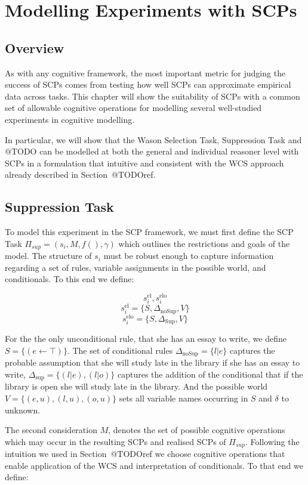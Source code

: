 \chapter{Modelling Experiments with SCPs} \label{chp:model}
\section{Overview}
As with any cognitive framework, the most important metric for judging the success of SCPs comes from testing how well SCPs can approximate empirical data across tasks. This chapter will show the suitability of SCPs with a common set of allowable cognitive operations for modelling several well-studied experiments in cognitive modelling.

In particular, we will show that the Wason Selection Task, Suppression Task and @TODO can be modelled at both the general and individual reasoner level with SCPs in a formulation that intuitive and consistent with the WCS approach already described in Section~@TODOref.
\section{Suppression Task} \label{sec:supSCP}



To model this experiment in the SCP framework, we must first define the SCP Task $\Pi_{sup}=(s_i,M,f(),\gamma)$ which outlines the restrictions and goals of the model. The structure of $s_i$ must be robust enough to capture information regarding a set of rules, variable assignments in the possible world, and conditionals. To this end we define:

\[s_i^\text{el},s_i^\text{elo}\]
\[s_i^\text{el}=\{S,\Delta_\text{noSup}, V\} \]
\[s_i^\text{elo}=\{S,\Delta_\text{Sup}, V\} \]




For the the only unconditional rule, that she has an essay to write, we define $S=\{(e \leftarrow \top)\}$. The set of conditional rules $\Delta_{\text{noSup}}=\{l|e\}$ captures the probable assumption that she will study late in the library if she has an essay to write, $\Delta_{\text{sup}}=\{(l|e),(l|o)\}$ captures the addition of the conditional that if the library is open she will study late in the library. And the possible world $V=\{(e,u),(l,u),(o,u)\}$ sets all variable names occurring in $S$ and $\delta$ to unknown.

The second consideration $M$, denotes the set of possible cognitive operations which may occur in the resulting SCPs and realised SCPs of $\Pi_{sup}$. Following the intuition we used in Section~@TODOref we choose cognitive operations that enable application of the WCS and interpretation of conditionals. To that end we define:

